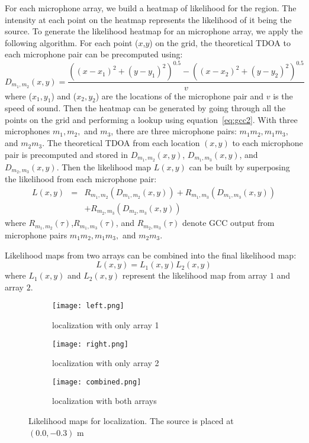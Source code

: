 For each microphone array, we build a heatmap of likelihood for the region. The intensity at each point on the heatmap represents the likelihood of it being the source. To generate the likelihood heatmap for an microphone array, we apply the following algorithm. For each point ($x$,$y$) on the grid, the theoretical TDOA to each microphone pair can be precomputed using:
\[
 D_{m_1,m_2}(x,y) =  \frac{((x-x_1)^2 + (y-y_1)^2)^{0.5} - ((x-x_2)^2 + (y-y_2)^2)^{0.5}}{v}
\]
where ($x_1, y_1$) and ($x_2, y_2$) are the locations of the microphone pair and $v$ is the speed of sound. Then the heatmap can be generated by going through all the points on the grid and performing a lookup using equation~\ref{eq:gcc2}. With three microphones $m_1,m_2,$ and $m_3$, there are three microphone pairs: $m_1m_2,m_1m_3,$ and $m_2m_3$. The theoretical TDOA from each location $(x,y)$ to each microphone pair is precomputed and stored in $D_{m_1,m_2}(x,y)$, $D_{m_1,m_3}(x,y)$, and $D_{m_2,m_3}(x,y)$. Then the likelihood map $L(x,y)$ can be built by superposing the likelihood from each microphone pair:
\begin{eqnarray*}
L(x,y) &=& R_{m_1,m_2}(D_{m_1,m_2}(x,y)) + R_{m_1,m_3}(D_{m_1,m_3}(x,y)) \\
 & & +R_{m_2,m_3}(D_{m_2,m_3}(x,y)) 
\end{eqnarray*}
where $R_{m_1,m_2}(\tau)$,$R_{m_1,m_3}(\tau)$, and $R_{m_2,m_3}(\tau)$ denote GCC output from microphone pairs $m_1m_2,m_1m_3,$ and $m_2m_3$.

Likelihood maps from two arrays can be combined into the final likelihood map:
\begin{equation}\label{eq:combine_l}
L(x,y) = L_1(x,y) L_2(x,y)
\end{equation}
where $L_1(x,y)$ and $L_2(x,y)$ represent the likelihood map from array $1$ and array $2$.

\begin{figure}[h!]
  \centering
  \begin{subfigure}[]{.48\textwidth}
    \texttt{[image: left.png]}
    \caption{localization with only array 1}
    \label{fig:liklihood1}
  \end{subfigure}
  \begin{subfigure}[]{.48\textwidth}
    \texttt{[image: right.png]}
    \caption{localization with only array 2}
    \label{fig:liklihood2}
  \end{subfigure}
  \begin{subfigure}[]{.48\textwidth}
    \texttt{[image: combined.png]}
    \caption{localization with both arrays}
    \label{fig:liklihood3}
  \end{subfigure}
  \caption{Likelihood maps for localization. The source is placed at $(0.0,-0.3)$ m}
  \label{fig:liklihood}
\end{figure}

